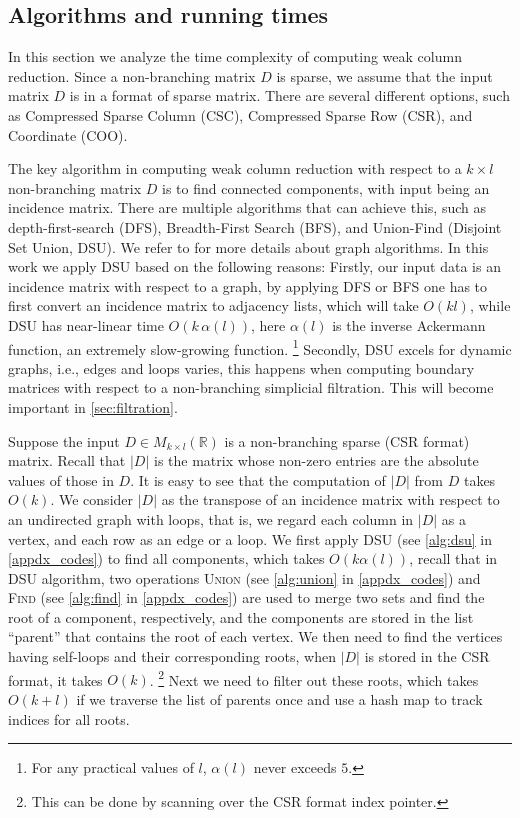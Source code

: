 \documentclass{article}
\theoremstyle{definition}
\begin{document}
\subsection{Algorithms and running times}
In this section we analyze the time complexity of computing weak column reduction.
Since a non-branching matrix $D$ is sparse,
we assume that the input matrix $D$ is in a format of sparse matrix.
There are several different options, 
such as
Compressed Sparse Column (CSC),
Compressed Sparse Row (CSR),
and Coordinate (COO).

The key algorithm in computing weak column reduction with respect to a $k\times l$ non-branching matrix $D$ is to find connected components, with input being an incidence matrix.
There are multiple algorithms that can achieve this,
such as depth-first-search (DFS),
Breadth-First Search (BFS),
and Union-Find (Disjoint Set Union, DSU).
We refer to \cite{cormen2022introduction} for more details about graph algorithms.
In this work we apply DSU based on the following reasons:
Firstly,
our input data is an incidence matrix with respect to a graph,
by applying DFS or BFS one has to first convert an incidence matrix to adjacency lists,
which will take $O(kl)$,
while DSU has near-linear time $O(k \, \alpha (l))$,
here $\alpha (l)$ is the inverse Ackermann function,
an extremely slow-growing function.
\footnote{For any practical values of $l$,
$\alpha(l)$ never exceeds $5$.
}
Secondly,
DSU excels for dynamic graphs,
i.e.,
edges and loops varies,
this happens when computing boundary matrices with respect to a non-branching simplicial filtration. This will become important in \cref{sec:filtration}.

Suppose the input $D\in M_{k\times l}(\mathbb{R})$ is a non-branching sparse (CSR format) matrix.
Recall that $|D|$ is the matrix whose non-zero entries are the absolute values of those in $D$.
It is easy to see that the computation of $|D|$ from $D$ takes $O(k)$.
We consider $|D|$ as the transpose of an incidence matrix with respect to an undirected graph with loops,
that is,
we regard each column in $|D|$ as a vertex,
and each row as an edge or a loop.
We first apply DSU (see \cref{alg:dsu} in \cref{appdx_codes}) to find all components,
which takes $O(k\alpha(l))$,
recall that in DSU algorithm, 
two operations \textsc{Union} (see \cref{alg:union} in \cref{appdx_codes}) and
\textsc{Find} (see \cref{alg:find} in \cref{appdx_codes}) are used to merge two sets and find the root of a component, respectively,
and the components are stored in the list ``parent'' that contains the root of each vertex. 
We then need to find the vertices having self-loops and their corresponding roots,
when $|D|$ is stored in the CSR format,
it takes $O(k)$.
\footnote{This can be done by scanning over the CSR format index pointer.}
Next we need to filter out these roots, 
which takes $O(k+l)$ if we traverse the list of parents once and use a hash map to track indices for all roots.
\end{document}
